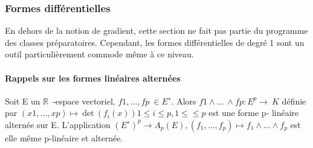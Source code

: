 
\subsubsection{Formes différentielles}

\begin{example}[Remarque]
En dehors de la notion de gradient, cette section ne
fait pas partie du programme des classes préparatoires. Cependant, les
formes différentielles de degré 1 sont un outil particulièrement commode
même à ce niveau.
\end{example}
\paragraph{Rappels sur les formes linéaires alternées}

\begin{prop}
  Soit E un $\mathbb{R}$~-espace vectoriel,
$f1,\ldots,fp~
\in E^∗$. 
Alors $f1∧\ldots~ ∧
fp : E^p \rightarrow~ K$ définie par
$(x1,\ldots,xp)\mapsto~\mathrm{det}~
(f_i(x)) 1 \leq i \leq p, 1 \leq \leq p$ est une forme p-
linéaire alternée sur E. L'application $(E^∗)^p \rightarrow A_p(E),(f_1,\ldots,f_p) \mapsto f_1 ∧ \ldots ∧ f_p$ 
est elle même p-linéaire et alternée.
\end{prop}





